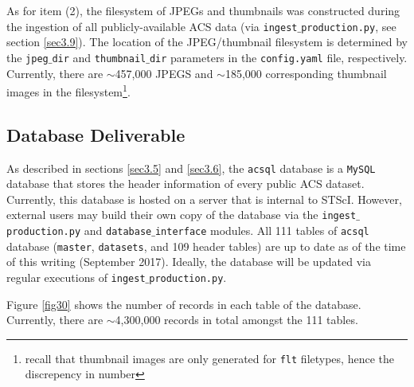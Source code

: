 \documentclass[10pt,journal,compsoc]{IEEEtran}
\begin{document}
As for item (2), the filesystem of JPEGs and thumbnails was constructed during the ingestion of all publicly-available ACS data (via \texttt{ingest$\_$production.py}, see section \ref{sec3.9}).
The location of the JPEG/thumbnail filesystem is determined by the \texttt{jpeg$\_$dir} and \texttt{thumbnail$\_$dir} parameters in the \texttt{config.yaml} file, respectively.
Currently, there are $\sim$457,000 JPEGS and $\sim$185,000 corresponding thumbnail images in the filesystem\footnote{recall that thumbnail images are only generated for \texttt{flt} filetypes,
hence the discrepency in number}.


\subsection{Database Deliverable} \label{sec4.2}

As described in sections \ref{sec3.5} and \ref{sec3.6}, the \texttt{acsql} database is a \texttt{MySQL} database that stores the header information of every public ACS dataset.  Currently,
this database is hosted on a server that is internal to STScI.  However, external users may build their own copy of the database via the \texttt{ingest$\_$production.py} and
\texttt{database$\_$interface} modules.  All 111 tables of \texttt{acsql} database (\texttt{master}, \texttt{datasets}, and 109 header tables) are up to date as of the time of this writing
(September 2017).  Ideally, the database will be updated via regular executions of \texttt{ingest$\_$production.py}.

Figure \ref{fig30} shows the number of records in each table of the database.  Currently, there are $\sim$4,300,000 records in total amongst the 111 tables.
\end{document}
